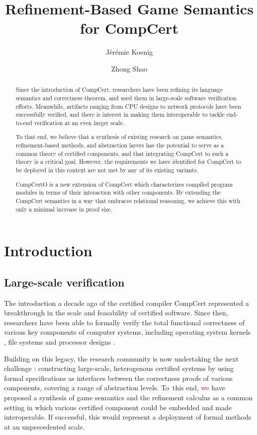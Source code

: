 \documentclass[acmsmall,authordraft]{acmart}
\title{Refinement-Based Game Semantics for CompCert} %
\author{J\'er\'emie Koenig}
\affiliation{Yale University}
\author{Zhong Shao}
\affiliation{Yale University}
\begin{document}
\begin{abstract} %
Since the introduction of CompCert,
researchers have been refining
its language semantics and correctness theorem,
and used them in
large-scale software verification efforts.
Meanwhile,
artifacts ranging from CPU designs to network protocols
have been successfully verified,
and there is interest in
making them interoperable
to tackle end-to-end verification
at an even larger scale.

To that end,
we believe that
a synthesis of existing research on
game semantics,
refinement-based methods, and
abstraction layers
has the potential to serve as a common theory
of certified components,
and that integrating CompCert to such a theory
is a critical goal.
However,
the requirements we have identified for
CompCert to be deployed in this context
are not met by any of its existing variants.

CompCertO is
a new extension of CompCert
which characterizes compiled program modules
in terms of their interaction with other components.
By extending the CompCert semantics
in a way that embraces relational reasoning,
we achieve this with only a minimal increase
in proof size.
\end{abstract}

\maketitle

\section{Introduction} %

\subsection{Large-scale verification} %

The introduction a decade ago of
the certified compiler CompCert \cite{compcert}
represented a breakthrough
in the scale and feasability of
certified software.
Since then,
researchers have been able to formally verify the
total functional correctness
of various key components of computer systems,
including
operating system kernels \cite{sel4,popl15},
file systems \cite{fscq} and
processor designs \cite{safe,kami}.

Building on this legacy,
the research community is now undertaking the next challenge
\cite{deepspec}:
constructing large-scale, heterogenous certified systems
by using formal specifications as interfaces
between the correctness proofs of various components,
covering a range of abstraction levels.
To~this end,
\textcolor{red}{we} have proposed
a synthesis of game semantics and the refinement calculus
\cite{rbgs-cal}
as a common setting
in which various
certified component could be embedded and
made interoperable.
If successful,
this would represent a deployment of formal methods
at an unprecedented scale.
\end{document}
